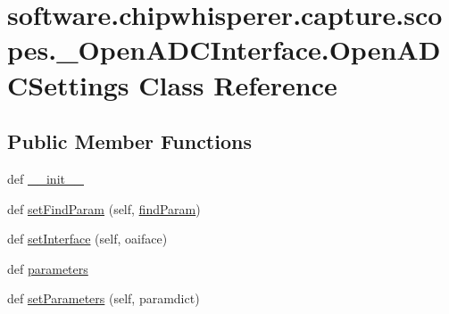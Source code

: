\hypertarget{classsoftware_1_1chipwhisperer_1_1capture_1_1scopes_1_1__OpenADCInterface_1_1OpenADCSettings}{}\section{software.\+chipwhisperer.\+capture.\+scopes.\+\_\+\+Open\+A\+D\+C\+Interface.\+Open\+A\+D\+C\+Settings Class Reference}
\label{classsoftware_1_1chipwhisperer_1_1capture_1_1scopes_1_1__OpenADCInterface_1_1OpenADCSettings}
\subsection*{Public Member Functions}
\begin{DoxyCompactItemize}
\item 
def \hyperlink{classsoftware_1_1chipwhisperer_1_1capture_1_1scopes_1_1__OpenADCInterface_1_1OpenADCSettings_a501662f76daa558f75a01f3808eb78c8}{\+\_\+\+\_\+init\+\_\+\+\_\+}
\item 
def \hyperlink{classsoftware_1_1chipwhisperer_1_1capture_1_1scopes_1_1__OpenADCInterface_1_1OpenADCSettings_a6e084f5a480f9e5fb77a13189d6327d2}{set\+Find\+Param} (self, \hyperlink{classsoftware_1_1chipwhisperer_1_1capture_1_1scopes_1_1__OpenADCInterface_1_1OpenADCSettings_a6d6bccd80e93678997eee44bcd3d5339}{find\+Param})
\item 
def \hyperlink{classsoftware_1_1chipwhisperer_1_1capture_1_1scopes_1_1__OpenADCInterface_1_1OpenADCSettings_a9572807d9ffdb32a03b41af375b01b13}{set\+Interface} (self, oaiface)
\item 
def \hyperlink{classsoftware_1_1chipwhisperer_1_1capture_1_1scopes_1_1__OpenADCInterface_1_1OpenADCSettings_a941ccee56dc18830a16ff9c0fb46e25d}{parameters}
\item 
def \hyperlink{classsoftware_1_1chipwhisperer_1_1capture_1_1scopes_1_1__OpenADCInterface_1_1OpenADCSettings_a8b997f09779cf5cabb7d13328f5e8a9f}{set\+Parameters} (self, paramdict)
\end{DoxyCompactItemize}
